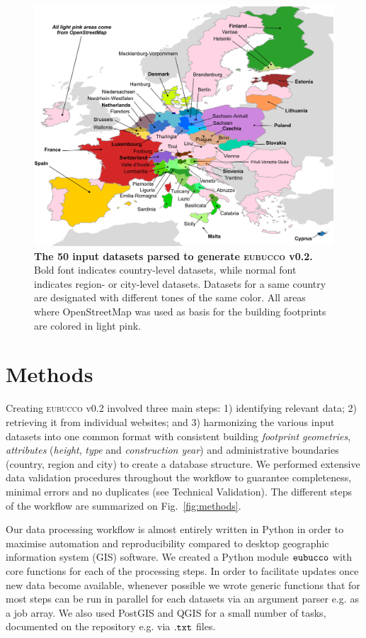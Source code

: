\documentclass[fleqn,10pt]{wlscirep}
\begin{document}
\begin{figure}[h!]
\centering
\includegraphics[width=\linewidth]{figs/intro_fig.png}
\caption{\textbf{The 50 input datasets parsed to generate \textsc{eubucco} v0.2.} Bold font indicates country-level datasets, while normal font indicates region- or city-level datasets. Datasets for a same country are designated with different tones of the same color. All areas where OpenStreetMap was used as basis for the building footprints are colored in light pink.}
\label{fig:intro_fig}
\end{figure}


\section*{Methods}

Creating \textsc{eubucco} v0.2 involved three main steps: 1) identifying relevant data; 2) retrieving it from individual websites; and 3) harmonizing the various input datasets into one common format with consistent building \textit{footprint geometries}, \textit{attributes} (\textit{height}, \textit{type} and \textit{construction year}) and administrative boundaries (country, region and city) to create a database structure. We performed extensive data validation procedures throughout the workflow to guarantee completeness, minimal errors and no duplicates (see Technical Validation). The different steps of the workflow are summarized on Fig.~\ref{fig:methods}. 

Our data processing workflow\cite{eubucco-0.2-code2022} is almost entirely written in Python in order to maximise automation and reproducibility compared to desktop geographic information system (GIS) software. We created a Python module ${\tt eubucco}$ with core functions for each of the processing steps. In order to facilitate updates once new data become available, whenever possible we wrote generic functions that for most steps can be run in parallel for each datasets via an argument parser e.g. as a job array. We also used PostGIS and QGIS for a small number of tasks, documented on the repository e.g. via ${\tt.txt}$ files.  
\end{document}
